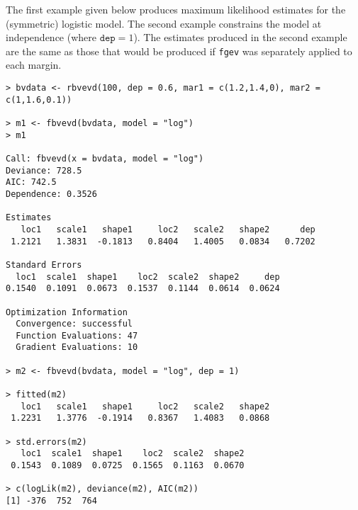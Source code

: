 \documentclass[11pt,a4paper]{article}
\begin{document}

The first example given below produces maximum likelihood estimates for the (symmetric) logistic model.
The second example constrains the model at independence (where $\texttt{dep} = 1$).
The estimates produced in the second example are the same as those that would be produced if \verb+fgev+ was separately applied to each margin. 

\begin{verbatim}
> bvdata <- rbvevd(100, dep = 0.6, mar1 = c(1.2,1.4,0), mar2 = c(1,1.6,0.1))

> m1 <- fbvevd(bvdata, model = "log")
> m1

Call: fbvevd(x = bvdata, model = "log") 
Deviance: 728.5 
AIC: 742.5
Dependence: 0.3526 

Estimates
   loc1   scale1   shape1     loc2   scale2   shape2      dep  
 1.2121   1.3831  -0.1813   0.8404   1.4005   0.0834   0.7202  

Standard Errors
  loc1  scale1  shape1    loc2  scale2  shape2     dep  
0.1540  0.1091  0.0673  0.1537  0.1144  0.0614  0.0624  

Optimization Information
  Convergence: successful 
  Function Evaluations: 47 
  Gradient Evaluations: 10

> m2 <- fbvevd(bvdata, model = "log", dep = 1)

> fitted(m2)
   loc1   scale1   shape1     loc2   scale2   shape2 
 1.2231   1.3776  -0.1914   0.8367   1.4083   0.0868

> std.errors(m2)
   loc1  scale1  shape1    loc2  scale2  shape2 
 0.1543  0.1089  0.0725  0.1565  0.1163  0.0670

> c(logLik(m2), deviance(m2), AIC(m2))
[1] -376  752  764
\end{verbatim}
\end{document}
